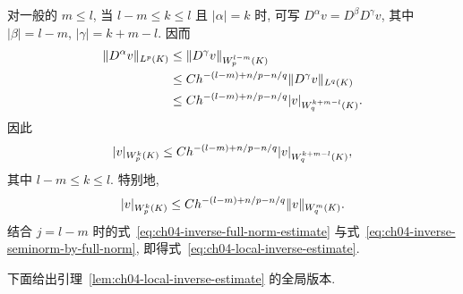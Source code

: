 \begin{Proof}
对一般的 $m\leq l$, 当 $l-m\leq k\leq l$ 且 $|\alpha|=k$ 时, 可写 $D^\alpha v=D^\beta D^\gamma v$, 其中 $|\beta|=l-m$, $|\gamma|=k+m-l$. 因而
\[
\MathBookFormulaID{formula-ch04-inverse-derivative-decomposition}
\begin{aligned}
\|D^\alpha v\|_{L^p(K)}
&\leq\|D^\gamma v\|_{W_p^{l-m}(K)}\\
&\leq Ch^{-(l-m)+n/p-n/q}\|D^\gamma v\|_{L^q(K)}\\
&\leq Ch^{-(l-m)+n/p-n/q}|v|_{W_q^{k+m-l}(K)}.
\end{aligned}
\]
因此
\begin{equation}
\MathBookFormulaID{formula-ch04-inverse-seminorm-estimate}
\label{eq:ch04-inverse-seminorm-estimate}
|v|_{W_p^k(K)}
\leq Ch^{-(l-m)+n/p-n/q}|v|_{W_q^{k+m-l}(K)},
\end{equation}
其中 $l-m\leq k\leq l$. 特别地,
\begin{equation}
\MathBookFormulaID{formula-ch04-inverse-seminorm-by-full-norm}
\label{eq:ch04-inverse-seminorm-by-full-norm}
|v|_{W_p^k(K)}
\leq Ch^{-(l-m)+n/p-n/q}\|v\|_{W_q^m(K)}.
\end{equation}
结合 $j=l-m$ 时的式~\eqref{eq:ch04-inverse-full-norm-estimate} 与式~\eqref{eq:ch04-inverse-seminorm-by-full-norm}, 即得式~\eqref{eq:ch04-local-inverse-estimate}.
\end{Proof}

下面给出引理~\ref{lem:ch04-local-inverse-estimate} 的全局版本.

